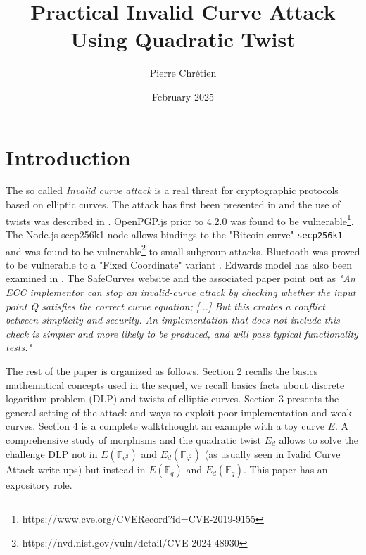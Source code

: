 \documentclass[10pt]{article}
\theoremstyle{definition}
\newcommand{\F}{\mathbb{F}}
\begin{document}

\author{Pierre Chrétien}
\title{Practical Invalid Curve Attack Using Quadratic Twist}
\date{February 2025}
\maketitle


\section{Introduction}

The so called \textsl{Invalid curve attack} is a real threat for cryptographic protocols based on elliptic curves.
The attack has first been presented in \cite{BMM00} and the use of twists was described in \cite{FLRV08}.
OpenPGP.js prior to 4.2.0 was found to be vulnerable\footnote{https://www.cve.org/CVERecord?id=CVE-2019-9155}. 
The Node.js secp256k1-node allows bindings to the  "Bitcoin curve" \verb|secp256k1| and was found to be vulnerable\footnote{https://nvd.nist.gov/vuln/detail/CVE-2024-48930} to small subgroup attacks.
Bluetooth was proved to be vulnerable to a "Fixed Coordinate" variant  \cite{cryptoeprint:2019/1043}.
Edwards model has also been examined in \cite{NT15}.
The SafeCurves website and the associated paper \cite{cryptoeprint:2024/1265} point out as 
\textsl{"An ECC implementor can stop an invalid-curve attack by checking whether the input point Q satisfies the correct curve equation; [...]
But this creates a conflict between simplicity and security. An implementation that does not include this check is simpler and more likely to be produced, and will pass typical functionality tests."}


The rest of the paper is organized as follows.
Section 2 recalls the basics mathematical concepts used  in the sequel, we recall basics facts about discrete logarithm problem (DLP) and twists of elliptic curves. 
Section 3 presents the general setting of the attack and ways to exploit poor implementation and weak curves.
Section 4 is a complete walktrhought an example with a toy curve $E$.
A comprehensive study of morphisms and the quadratic twist $E_d$ allows to solve the challenge DLP not in $E(\F_{q^2})$ and $E_d(\F_{q^2})$ (as usually seen in Ivalid Curve Attack write ups) but instead in $E(\F_{q})$ and $E_d(\F_{q})$. 
This paper has an expository role.
\end{document}
